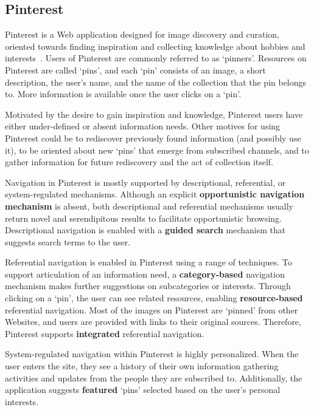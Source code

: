 \documentclass{sigchi}
\begin{document}
{{{\subsection{Pinterest}
Pinterest is a Web application designed for image discovery and curation, oriented towards finding inspiration and collecting knowledge about hobbies and interests~\cite{gilbert2013need,zarro2012pinterest,ottoni2013ladies}.  Users of Pinterest are commonly referred to as `pinners'. Resources on Pinterest are called `pins', and each `pin' consists of an image, a short description, the user's name, and the name of the collection that the pin belongs to. More information is available once the user clicks on a `pin'.

Motivated by the desire to gain inspiration and knowledge, Pinterest users have either under-defined or absent information needs. Other motives for using Pinterest could be to rediscover previously found information (and possibly use it), to be oriented about new `pins' that emerge from subscribed channels, and to gather information for future rediscovery and the act of collection itself.


Navigation in Pinterest is mostly supported by descriptional, referential, or system-regulated mechanisms. Although an explicit \textbf{opportunistic navigation mechanism} is absent, both descriptional and referential mechanisms usually return novel and serendipitous results to facilitate opportunistic browsing. Descriptional navigation is enabled with a \textbf{guided search} mechanism that suggests search terms to the user. 

Referential navigation is enabled in Pinterest using a range of techniques. To support articulation of an information need, a \textbf{category-based} navigation mechanism makes further suggestions on subcategories or interests. Through clicking on a `pin', the user can see related resources, enabling \textbf{resource-based} referential navigation. Most of the images on Pinterest are `pinned' from other Websites, and users are provided with links to their original sources. Therefore, Pinterest supports \textbf{integrated} referential navigation.

System-regulated navigation within Pinterest is highly personalized. When the user enters the site, they see a history of their own information gathering activities and updates from the people they are subscribed to. Additionally, the application suggests \textbf{featured} `pins' selected based on the user's personal interests.

}}}
\end{document}
